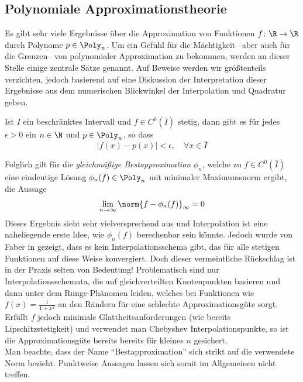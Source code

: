 \subsection{Polynomiale Approximationstheorie}
\label{sec:poly_approx}
Es gibt sehr viele Ergebnisse über die Approximation von Funktionen $f\colon \R\to\R$ durch Polynome $p\in\Poly_n$. Um ein Gefühl für die Mächtigkeit --aber auch für die Grenzen-- von polynomialer Approximation zu bekommen, werden an dieser Stelle einige zentrale Sätze genannt. Auf Beweise werden wir größtenteils verzichten, jedoch basierend auf \autocite{Trefethen} eine Diskussion der Interpretation dieser Ergebnisse aus dem numerischen Blickwinkel der Interpolation und Quadratur geben.
\begin{maththeorem}[Weierstrass]
Ist $I$ ein beschränktes Intervall und $f\in C^0(\bar{I})$ stetig, dann gibt es für jedes $\epsilon >0$ ein $n\in\N$ und $p\in\Poly_n$, so dass
\[|f(x)-p(x)|<\epsilon,\quad \forall x\in\bar{I}\]
\end{maththeorem}
Folglich gilt für die \emph{gleichmäßige Bestapproximation} $\phi_n$, welche zu $f\in C^0(\bar{I})$ eine eindeutige Lösung $\phi_n(f)\in\Poly_n$ mit minimaler Maximumsnorm ergibt, die Aussage
\[\lim\limits_{n\to\infty}\norm{f-\phi_n(f)}_\infty=0\] 
Dieses Ergebnis sieht sehr vielversprechend aus und Interpolation ist eine naheliegende erste Idee, wie $\phi_n(f)$ berechenbar sein könnte. Jedoch wurde von Faber in \autocite{faber14} gezeigt, dass es kein Interpolationsschema gibt, das für alle stetigen Funktionen auf diese Weise konvergiert. Doch dieser vermeintliche Rückschlag ist in der Praxis selten von Bedeutung! Problematisch sind nur Interpolationsschemata, die auf gleichverteilten Knotenpunkten basieren und dann unter dem Runge-Phänomen leiden, welches bei Funktionen wie $f(x)=\frac{1}{1+x^2}$ an den Rändern für eine schlechte Approximationsgüte sorgt. Erfüllt $f$ jedoch minimale Glattheitsanforderungen (wie bereits Lipschitzstetigkeit) und verwendet man Chebyshev Interpolationspunkte, so ist die Approximationsgüte bereits bereits für kleines $n$ gesichert.\\
Man beachte, dass der Name "`Bestapproximation"' sich strikt auf die verwendete Norm bezieht. Punktweise Aussagen lassen sich somit im Allgemeinen nicht treffen. 
